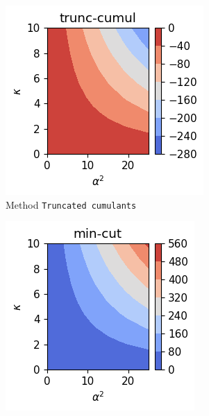 \begin{figure}[h!]
    \centering
    \begin{subfigure}{0.32\linewidth}
        \centering
        \includegraphics[width=\linewidth]{Pics/H_0_and_losses_2_p_2_rule_trunc-cumul.pdf}
        \caption{Method \texttt{Truncated cumulants}}
        \label{fig:H_0_and_losses_2_p_2_rule_trunc-cumul}
    \end{subfigure}
    \hfill
    \begin{subfigure}{0.32\linewidth}
        \centering
        \includegraphics[width=\linewidth]{Pics/H_0_and_losses_2_p_2_rule_min-cut.pdf}

\end{subfigure}
\end{figure}
